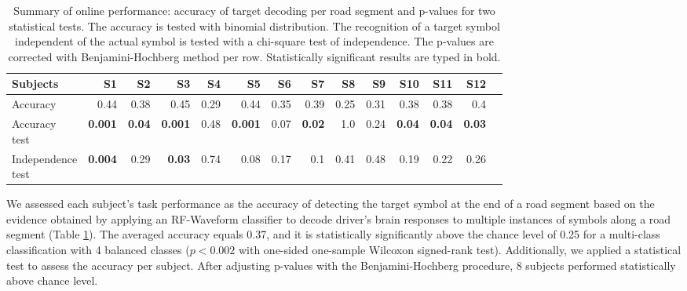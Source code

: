 \documentclass[12pt]{iopart}
\begin{document}
\begin{table}
    \centering
    \caption{Summary of online performance: accuracy of target decoding per road segment
        and p-values for two statistical tests. The accuracy is tested with binomial distribution.
        The recognition of a target symbol independent of the actual symbol is tested
        with a chi-square test of independence.  The p-values are corrected with Benjamini-Hochberg method per row.
    Statistically significant results are typed in bold.}
    \scriptsize
    \renewcommand{\arraystretch}{1.5}
    \begin{tabular}{l r r r r r r r r r r r r r}
        \hline
        Subjects & S1 & S2 & S3 & S4 & S5 & S6 & S7 & S8 & S9 & S10 & S11 & S12 \\
        \hline

        Accuracy & 0.44 & 0.38 & 0.45 & 0.29 & 0.44 & 0.35 & 0.39 & 0.25 & 0.31 & 0.38 & 0.38 & 0.4 \\ 
        \shortstack{Accuracy \\ test} & \textbf{0.001} & \textbf{0.04} & \textbf{0.001}
        & 0.48 & \textbf{0.001} & 0.07 & \textbf{0.02} & 1.0 & 0.24 & \textbf{0.04} & \textbf{0.04} & \textbf{0.03} \\
        \shortstack{Independence \\ test}  & \textbf{0.004} & 0.29 & \textbf{0.03} & 0.74
        & 0.08 & 0.17 & 0.1 & 0.41 & 0.48 & 0.19 & 0.22 & 0.26 \\
        \hline
    \end{tabular}
    \label{tab:onlineperf}
\end{table}

We assessed each subject's task performance as the accuracy of
detecting the target symbol at the end of a road segment based on the evidence obtained by applying an RF-Waveform classifier
to decode driver’s brain responses to multiple instances of symbols along a road segment (Table \ref{tab:onlineperf}).
The averaged accuracy 
equals 0.37, and it is statistically significantly above the chance level of 0.25 for
a multi-class classification with 4 balanced classes ($p < 0.002$ with one-sided one-sample Wilcoxon signed-rank test).
Additionally, we applied a statistical test to assess the accuracy per subject.
After adjusting p-values with the Benjamini-Hochberg procedure, 8 subjects performed statistically above chance level.
\end{document}
